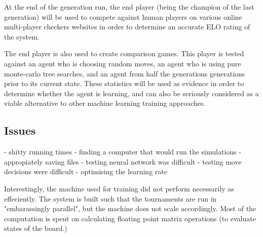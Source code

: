 \documentclass[12pt,a4paper]{article}
\begin{document}
        At the end of the generation run, the end player (being the champion of the last generation) will be used to compete against human players on various online multi-player checkers websites in order to determine an accurate ELO rating of the system.
    
        The end player is also used to create comparison games. This player is tested against an agent who is choosing random moves, an agent who is using pure monte-carlo tree searches, and an agent from half the generations generations prior to its current state. These statistics will be used as evidence in order to determine whether the agent is learning, and can also be seriously considered as a viable alternative to other machine learning training approaches.
    
    \subsection{Issues}
        - shitty running times
        - finding a computer that would run the simulations
        - appropiately saving files
        - testing neural network was difficult
        - testing move decisions were difficult
        - optimising the learning rate

    Interestingly, the machine used for training did not perform necessarily as effeciently. The system is built such that the tournaments are run in "embarassingly parallel", but the machine does not scale accordingly. Most of the computation is spent on calculating floating point matrix operations (to evaluate states of the board.)
\end{document}
